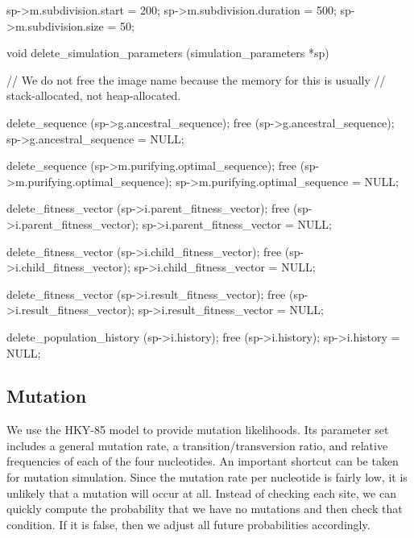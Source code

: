 \documentclass{article}
\begin{document}
\begin{ccode}
{  sp->m.subdivision.start               = 200;
  sp->m.subdivision.duration            = 500;
  sp->m.subdivision.size                = 50;
}


void delete_simulation_parameters (simulation_parameters *sp) {
  // We do not free the image name because the memory for this is usually
  // stack-allocated, not heap-allocated.

  delete_sequence (sp->g.ancestral_sequence);
  free (sp->g.ancestral_sequence);
  sp->g.ancestral_sequence = NULL;

  delete_sequence (sp->m.purifying.optimal_sequence);
  free (sp->m.purifying.optimal_sequence);
  sp->m.purifying.optimal_sequence = NULL;

  delete_fitness_vector (sp->i.parent_fitness_vector);
  free (sp->i.parent_fitness_vector);
  sp->i.parent_fitness_vector = NULL;

  delete_fitness_vector (sp->i.child_fitness_vector);
  free (sp->i.child_fitness_vector);
  sp->i.child_fitness_vector = NULL;

  delete_fitness_vector (sp->i.result_fitness_vector);
  free (sp->i.result_fitness_vector);
  sp->i.result_fitness_vector = NULL;

  delete_population_history (sp->i.history);
  free (sp->i.history);
  sp->i.history = NULL;
}
\end{ccode}
    
    \subsection{Mutation}
    
      We use the HKY-85 model to provide mutation likelihoods. Its parameter set
      includes a general mutation rate, a transition/transversion ratio, and
      relative frequencies of each of the four nucleotides. An important
      shortcut can be taken for mutation simulation. Since the mutation rate per
      nucleotide is fairly low, it is unlikely that a mutation will occur at
      all. Instead of checking each site, we can quickly compute the probability
      that we have no mutations and then check that condition. If it is false,
      then we adjust all future probabilities accordingly.
\end{document}
